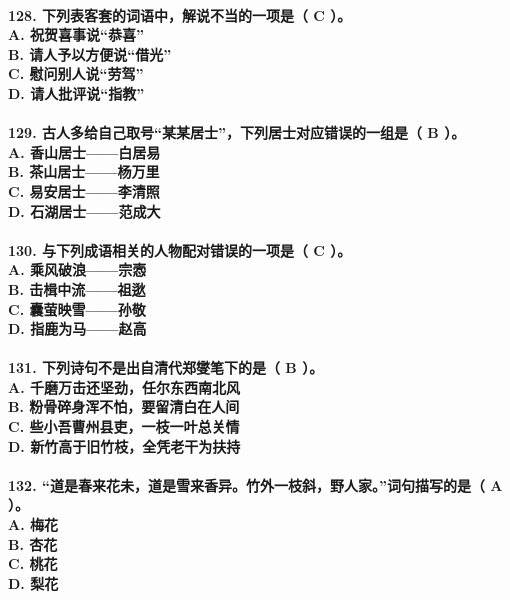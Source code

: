 \documentclass[UTF8]{ctexart} %
\begin{document}
\paragraph{
128. 下列表客套的词语中，解说不当的一项是（ \color{red}C\color{black} ）。 \\
    A. 祝贺喜事说“恭喜” \\
    B. 请人予以方便说“借光” \\
    C. 慰问别人说“劳驾” \\
    D. 请人批评说“指教”
}
\paragraph{
129. 古人多给自己取号“某某居士”，下列居士对应错误的一组是（ \color{red}B\color{black} ）。 \\
    A. 香山居士——白居易 \\
    B. 茶山居士——杨万里 \\
    C. 易安居士——李清照 \\
    D. 石湖居士——范成大
}
\paragraph{
130. 与下列成语相关的人物配对错误的一项是（ \color{red}C\color{black} ）。 \\
    A. 乘风破浪——宗悫 \\
    B. 击楫中流——祖逖 \\
    C. 囊萤映雪——孙敬 \\
    D. 指鹿为马——赵高
}
\paragraph{
131. 下列诗句不是出自清代郑燮笔下的是（ \color{red}B\color{black} ）。 \\
    A. 千磨万击还坚劲，任尔东西南北风 \\
    B. 粉骨碎身浑不怕，要留清白在人间 \\
    C. 些小吾曹州县吏，一枝一叶总关情 \\
    D. 新竹高于旧竹枝，全凭老干为扶持
}
\paragraph{
132. “道是春来花未，道是雪来香异。竹外一枝斜，野人家。”词句描写的是（ \color{red}A\color{black} ）。 \\
    A. 梅花 \\
    B. 杏花 \\
    C. 桃花 \\
    D. 梨花
}
\end{document}

